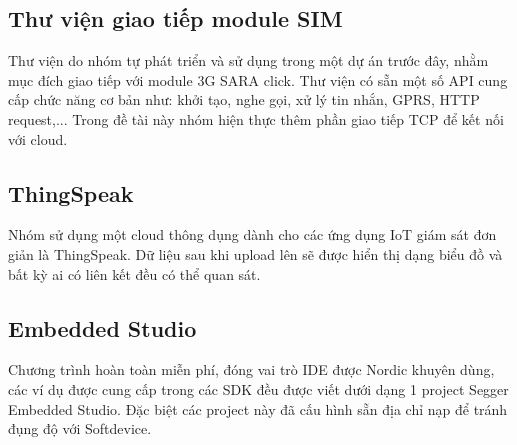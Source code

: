     	\subsection{Thư viện giao tiếp module SIM}
    	Thư viện do nhóm tự phát triển và sử dụng trong một dự án trước đây, nhằm mục đích giao tiếp với module 3G SARA click. Thư viện có sẵn một số API cung cấp chức năng cơ bản như: khởi tạo, nghe gọi, xử lý tin nhắn, GPRS, HTTP request,... Trong đề tài này nhóm hiện thực thêm phần giao tiếp TCP để kết nối với cloud.
    	\subsection{ThingSpeak}
    	Nhóm sử dụng một cloud thông dụng dành cho các ứng dụng IoT giám sát đơn giản là ThingSpeak. Dữ liệu sau khi upload lên sẽ được hiển thị dạng biểu đồ và bất kỳ ai có liên kết đều có thể quan sát.
    	\subsection{Embedded Studio}
    	Chương trình hoàn toàn miễn phí, đóng vai trò IDE được Nordic khuyên dùng, các ví dụ được cung cấp trong các SDK đều được viết dưới dạng 1 project Segger Embedded Studio. Đặc biệt các project này đã cấu hình sẵn địa chỉ nạp để tránh đụng độ với Softdevice.
    
    
